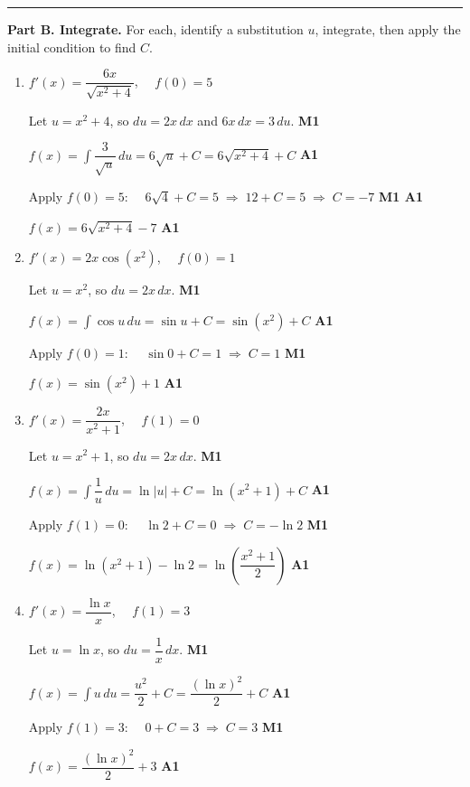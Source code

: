 \documentclass[12pt, twoside]{article}
\begin{document}
\bigskip
\hrule
\bigskip

\textbf{Part B. Integrate.} \quad For each, identify a substitution $u$, integrate, then apply the initial condition to find $C$.

\begin{enumerate}[itemsep=0.3cm, resume]

\item[7.] $f'(x) = \dfrac{6x}{\sqrt{x^2 + 4}}$, $\quad f(0) = 5$

\medskip

Let $u = x^2 + 4$, so $du = 2x\,dx$ and $6x\,dx = 3\,du$. \hfill \textbf{M1}

$\displaystyle f(x) = \int \dfrac{3}{\sqrt{u}}\,du = 6\sqrt{u} + C = 6\sqrt{x^2 + 4} + C$ \hfill \textbf{A1}

Apply $f(0) = 5$: $\quad 6\sqrt{4} + C = 5 \;\Rightarrow\; 12 + C = 5 \;\Rightarrow\; C = -7$ \hfill \textbf{M1 A1}

$f(x) = 6\sqrt{x^2 + 4} - 7$ \hfill \textbf{A1}

\item[8.] $f'(x) = 2x \cos(x^2)$, $\quad f(0) = 1$

\medskip

Let $u = x^2$, so $du = 2x\,dx$. \hfill \textbf{M1}

$\displaystyle f(x) = \int \cos u\,du = \sin u + C = \sin(x^2) + C$ \hfill \textbf{A1}

Apply $f(0) = 1$: $\quad \sin 0 + C = 1 \;\Rightarrow\; C = 1$ \hfill \textbf{M1}

$f(x) = \sin(x^2) + 1$ \hfill \textbf{A1}

\item[9.] $f'(x) = \dfrac{2x}{x^2 + 1}$, $\quad f(1) = 0$

\medskip

Let $u = x^2 + 1$, so $du = 2x\,dx$. \hfill \textbf{M1}

$\displaystyle f(x) = \int \dfrac{1}{u}\,du = \ln|u| + C = \ln(x^2 + 1) + C$ \hfill \textbf{A1}

Apply $f(1) = 0$: $\quad \ln 2 + C = 0 \;\Rightarrow\; C = -\ln 2$ \hfill \textbf{M1}

$f(x) = \ln(x^2 + 1) - \ln 2 = \ln\!\left(\dfrac{x^2 + 1}{2}\right)$ \hfill \textbf{A1}

\item[10.] $f'(x) = \dfrac{\ln x}{x}$, $\quad f(1) = 3$

\medskip

Let $u = \ln x$, so $du = \dfrac{1}{x}\,dx$. \hfill \textbf{M1}

$\displaystyle f(x) = \int u\,du = \dfrac{u^2}{2} + C = \dfrac{(\ln x)^2}{2} + C$ \hfill \textbf{A1}

Apply $f(1) = 3$: $\quad 0 + C = 3 \;\Rightarrow\; C = 3$ \hfill \textbf{M1}

$f(x) = \dfrac{(\ln x)^2}{2} + 3$ \hfill \textbf{A1}

\end{enumerate}
\end{document}
